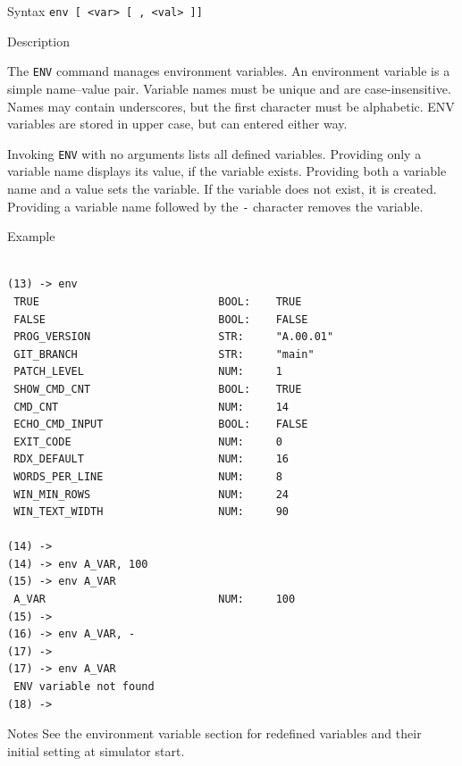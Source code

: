 %
%
\pagebreak
{}

\begin{iPageDescEntry}{Syntax}
\texttt{env [ <var> [ , <val> ]] } \\
\end{iPageDescEntry}

\begin{iPageDescEntry}{Description}

The \texttt{ENV} command manages environment variables. An environment variable is a simple name–value pair. Variable names must be unique and are case-insensitive. Names may contain underscores, but the first character must be alphabetic. ENV variables are stored in upper case, but can entered either way.

Invoking \texttt{ENV} with no arguments lists all defined variables. Providing only a variable name displays its value, if the variable exists. Providing both a variable name and a value sets the variable. If the variable does not exist, it is created. Providing a variable name followed by the \texttt{-} character removes the variable.

\end{iPageDescEntry}

\begin{iPageDescOpEntry}{Example}
\begin{lstlisting}[style=iPageOpStyle]

(13) -> env
 TRUE                            BOOL:    TRUE
 FALSE                           BOOL:    FALSE
 PROG_VERSION                    STR:     "A.00.01"
 GIT_BRANCH                      STR:     "main"
 PATCH_LEVEL                     NUM:     1
 SHOW_CMD_CNT                    BOOL:    TRUE
 CMD_CNT                         NUM:     14
 ECHO_CMD_INPUT                  BOOL:    FALSE
 EXIT_CODE                       NUM:     0
 RDX_DEFAULT                     NUM:     16
 WORDS_PER_LINE                  NUM:     8
 WIN_MIN_ROWS                    NUM:     24
 WIN_TEXT_WIDTH                  NUM:     90

(14) ->
(14) -> env A_VAR, 100
(15) -> env A_VAR
 A_VAR                           NUM:     100
(15) ->
(16) -> env A_VAR, -
(17) ->
(17) -> env A_VAR
 ENV variable not found
(18) ->

\end{lstlisting}
\end{iPageDescOpEntry}

\begin{iPageDescEntry}{Notes}
See the environment variable section for redefined variables and their initial setting at simulator start.
\end{iPageDescEntry}

